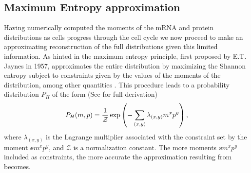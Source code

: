 \subsection{Maximum Entropy approximation}\label{sec_maxent}

Having numerically computed the moments of the mRNA and protein distributions
as cells progress through the cell cycle we now proceed to make an
approximating reconstruction of the full distributions given this limited
information. As hinted in  the maximum entropy principle,
first proposed by E.T. Jaynes in 1957, approximates the entire distribution by
maximizing the Shannon entropy subject to constraints given by the values of
the moments of the distribution, among other quantities \cite{Jaynes1957}. This
procedure leads to a probability distribution $P_H$ of the form (See
 for full derivation)
\begin{equation}
  P_H(m, p) = {1 \over \mathcal{Z}}
              \exp \left( - \sum_{(x,y)} \lambda_{(x,y)} m^x p^y \right),
  \label{eq_maxEnt_joint}
\end{equation}
where $\lambda_{(x,y)}$ is the Lagrange multiplier associated with the
constraint set by the moment $\ee{m^x p^y}$, and $\mathcal{Z}$ is a
normalization constant. The more moments $\ee{m^x p^y}$ included as
constraints, the more accurate the approximation resulting from
 becomes.

